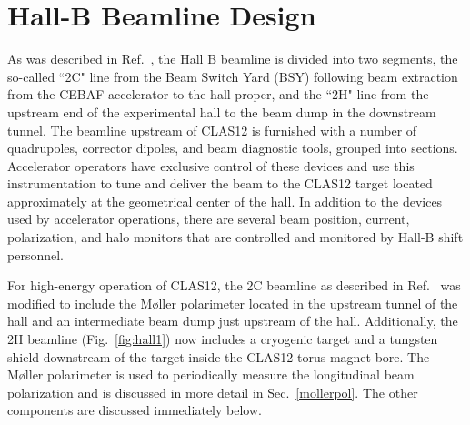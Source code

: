 
\section{Hall-B Beamline Design}
\label{beamlinedesign}

As was described in Ref.~\cite{HPSBeamline}, the Hall B beamline is divided into two segments, the so-called ``2C" line from the Beam 
Switch Yard (BSY) following beam extraction from the CEBAF accelerator to the hall proper, and the ``2H" line from the upstream end of 
the experimental hall to the beam dump in the downstream tunnel. The beamline upstream of CLAS12 is furnished with a number of 
quadrupoles, corrector dipoles, and beam diagnostic tools, grouped into sections. Accelerator operators have exclusive control of these 
devices and use this instrumentation to tune and deliver the beam to the CLAS12 target located approximately at the geometrical center of the 
hall. In addition to the devices used by accelerator operations, there are several beam position, current, polarization, and halo monitors that 
are controlled and monitored by Hall-B shift personnel. 

For high-energy operation of CLAS12, the 2C beamline as described in Ref.~\cite{HPSBeamline} was modified to include 
the M{\o}ller polarimeter located in the upstream tunnel of the hall %
 and an intermediate beam dump just upstream 
of the hall. Additionally, the 2H beamline (Fig.~\ref{fig:hall1}) now includes a cryogenic target and a tungsten shield downstream of the 
target inside the CLAS12 torus magnet bore. The M{\o}ller polarimeter is used to periodically measure the longitudinal beam polarization and is discussed in more detail in Sec.~\ref{mollerpol}.  The other components are discussed immediately below.


